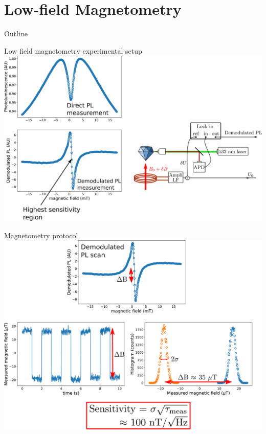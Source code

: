 \documentclass{beamer}
\begin{document}
\section{Low-field Magnetometry}
\begin{frame}{Outline}
\tableofcontents[currentsection]
\end{frame}
\begin{frame}{Low field magnetometry experimental setup}
\centering
\includegraphics[width=\textwidth,height=0.9\textheight,keepaspectratio]{Slide magneto 1}
\end{frame}
\begin{frame}{Magnetometry protocol}
\centering
\includegraphics[width=\textwidth,height=0.9\textheight,keepaspectratio]{Slide magneto 2}
\end{frame}
\end{document}
